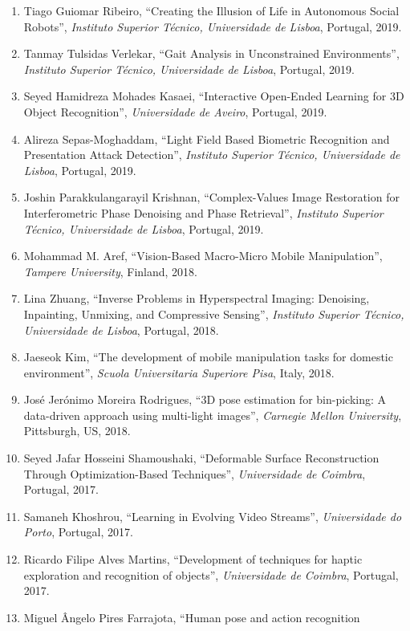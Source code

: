 \documentclass[
]{article}
\begin{document}
\begin{enumerate}
\item
  Tiago Guiomar Ribeiro, ``Creating the Illusion of Life in Autonomous
  Social Robots'', \emph{Instituto Superior Técnico, Universidade de
  Lisboa}, Portugal, 2019.
\item
  Tanmay Tulsidas Verlekar, ``Gait Analysis in Unconstrained
  Environments'', \emph{Instituto Superior Técnico, Universidade de
  Lisboa}, Portugal, 2019.
\item
  Seyed Hamidreza Mohades Kasaei, ``Interactive Open-Ended Learning for
  3D Object Recognition'', \emph{Universidade de Aveiro}, Portugal,
  2019.
\item
  Alireza Sepas-Moghaddam, ``Light Field Based Biometric Recognition and
  Presentation Attack Detection'', \emph{Instituto Superior Técnico,
  Universidade de Lisboa}, Portugal, 2019.
\item
  Joshin Parakkulangarayil Krishnan, ``Complex-Values Image Restoration
  for Interferometric Phase Denoising and Phase Retrieval'',
  \emph{Instituto Superior Técnico, Universidade de Lisboa}, Portugal,
  2019.
\item
  Mohammad M. Aref, ``Vision-Based Macro-Micro Mobile Manipulation'',
  \emph{Tampere University}, Finland, 2018.
\item
  Lina Zhuang, ``Inverse Problems in Hyperspectral Imaging: Denoising,
  Inpainting, Unmixing, and Compressive Sensing'', \emph{Instituto
  Superior Técnico, Universidade de Lisboa}, Portugal, 2018.
\item
  Jaeseok Kim, ``The development of mobile manipulation tasks for
  domestic environment'', \emph{Scuola Universitaria Superiore Pisa},
  Italy, 2018.
\item
  José Jerónimo Moreira Rodrigues, ``3D pose estimation for bin-picking:
  A data-driven approach using multi-light images'', \emph{Carnegie
  Mellon University}, Pittsburgh, US, 2018.
\item
  Seyed Jafar Hosseini Shamoushaki, ``Deformable Surface Reconstruction
  Through Optimization-Based Techniques'', \emph{Universidade de
  Coimbra}, Portugal, 2017.
\item
  Samaneh Khoshrou, ``Learning in Evolving Video Streams'',
  \emph{Universidade do Porto}, Portugal, 2017.
\item
  Ricardo Filipe Alves Martins, ``Development of techniques for haptic
  exploration and recognition of objects'', \emph{Universidade de
  Coimbra}, Portugal, 2017.
\item
  Miguel Ângelo Pires Farrajota, ``Human pose and action recognition

\end{enumerate}
\end{document}

